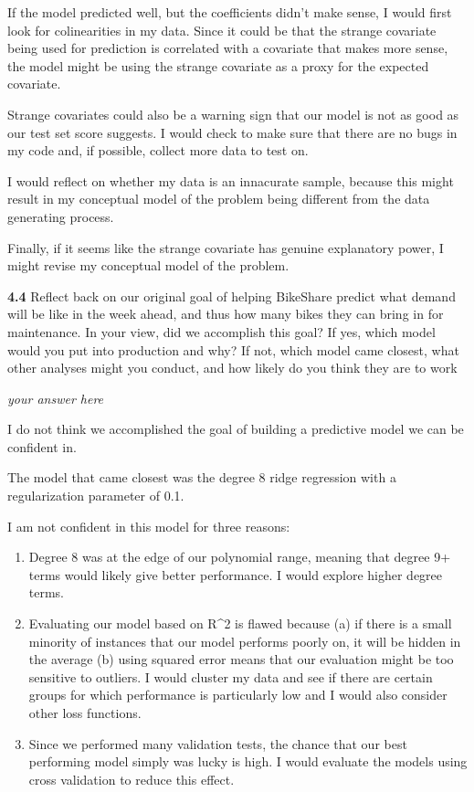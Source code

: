\documentclass[11pt]{article}
\begin{document}
If the model predicted well, but the coefficients didn't make sense, I
would first look for colinearities in my data. Since it could be that
the strange covariate being used for prediction is correlated with a
covariate that makes more sense, the model might be using the strange
covariate as a proxy for the expected covariate.

Strange covariates could also be a warning sign that our model is not as
good as our test set score suggests. I would check to make sure that
there are no bugs in my code and, if possible, collect more data to test
on.

I would reflect on whether my data is an innacurate sample, because this
might result in my conceptual model of the problem being different from
the data generating process.

Finally, if it seems like the strange covariate has genuine explanatory
power, I might revise my conceptual model of the problem.

    \textbf{4.4} Reflect back on our original goal of helping BikeShare
predict what demand will be like in the week ahead, and thus how many
bikes they can bring in for maintenance. In your view, did we accomplish
this goal? If yes, which model would you put into production and why? If
not, which model came closest, what other analyses might you conduct,
and how likely do you think they are to work

    \emph{your answer here}

I do not think we accomplished the goal of building a predictive model
we can be confident in.

The model that came closest was the degree 8 ridge regression with a
regularization parameter of 0.1.

I am not confident in this model for three reasons:

\begin{enumerate}
\def\labelenumi{\arabic{enumi})}
\item
  Degree 8 was at the edge of our polynomial range, meaning that degree
  9+ terms would likely give better performance. I would explore higher
  degree terms.
\item
  Evaluating our model based on R\^{}2 is flawed because (a) if there is
  a small minority of instances that our model performs poorly on, it
  will be hidden in the average (b) using squared error means that our
  evaluation might be too sensitive to outliers. I would cluster my data
  and see if there are certain groups for which performance is
  particularly low and I would also consider other loss functions.
\item
  Since we performed many validation tests, the chance that our best
  performing model simply was lucky is high. I would evaluate the models
  using cross validation to reduce this effect.
\end{enumerate}


    
    
    
    
\end{document}
